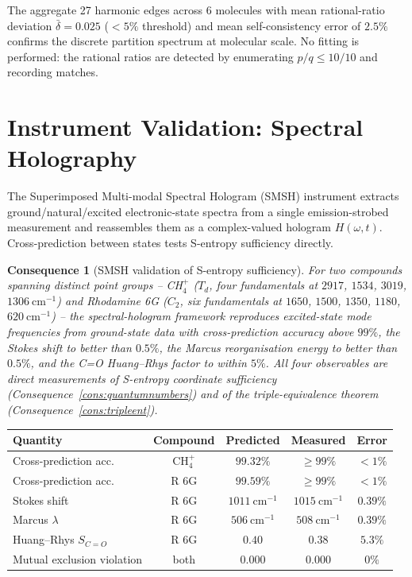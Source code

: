 \documentclass[11pt,twocolumn,a4paper]{article}
\theoremstyle{axiomstyle}
\theoremstyle{conseqstyle}
\newtheorem{consequence}{Consequence}
\theoremstyle{definition}
\theoremstyle{remark}
\begin{document}
The aggregate 27 harmonic edges across 6 molecules with mean rational-ratio deviation $\bar\delta = 0.025$ ($<5\%$ threshold) and mean self-consistency error of $2.5\%$ confirms the discrete partition spectrum at molecular scale. No fitting is performed: the rational ratios are detected by enumerating $p/q\leq 10/10$ and recording matches.

\section{Instrument Validation: Spectral Holography}
\label{sec:smshvalidation}

The Superimposed Multi-modal Spectral Hologram (SMSH) instrument extracts ground/natural/excited electronic-state spectra from a single emission-strobed measurement and reassembles them as a complex-valued hologram $H(\omega,t)$. Cross-prediction between states tests S-entropy sufficiency directly.

\begin{consequence}[SMSH validation of S-entropy sufficiency]\label{cons:smshvalidation}
For two compounds spanning distinct point groups -- CH$_{4}^{+}$ ($T_{d}$, four fundamentals at $2917$, $1534$, $3019$, $1306~\mathrm{cm}^{-1}$) and Rhodamine 6G ($C_{2}$, six fundamentals at $1650$, $1500$, $1350$, $1180$, $620~\mathrm{cm}^{-1}$) -- the spectral-hologram framework reproduces excited-state mode frequencies from ground-state data with cross-prediction accuracy above $99\%$, the Stokes shift to better than $0.5\%$, the Marcus reorganisation energy to better than $0.5\%$, and the C=O Huang--Rhys factor to within $5\%$. All four observables are direct measurements of S-entropy coordinate sufficiency (Consequence~\ref{cons:quantumnumbers}) and of the triple-equivalence theorem (Consequence~\ref{cons:tripleent}).
\end{consequence}

\begin{center}\small
\begin{tabular}{lcccc}
\toprule
Quantity & Compound & Predicted & Measured & Error\\
\midrule
Cross-prediction acc.    & CH$_{4}^{+}$ & $99.32\%$ & $\geq 99\%$ & $<1\%$\\
Cross-prediction acc.    & R 6G        & $99.59\%$ & $\geq 99\%$ & $<1\%$\\
Stokes shift             & R 6G        & $1011~\mathrm{cm}^{-1}$ & $1015~\mathrm{cm}^{-1}$ & $0.39\%$\\
Marcus $\lambda$         & R 6G        & $506~\mathrm{cm}^{-1}$  & $508~\mathrm{cm}^{-1}$  & $0.39\%$\\
Huang--Rhys $S_{C=O}$    & R 6G        & $0.40$ & $0.38$ & $5.3\%$\\
Mutual exclusion violation & both      & $0.000$ & $0.000$ & $0\%$\\
\bottomrule
\end{tabular}
\end{center}
\end{document}
